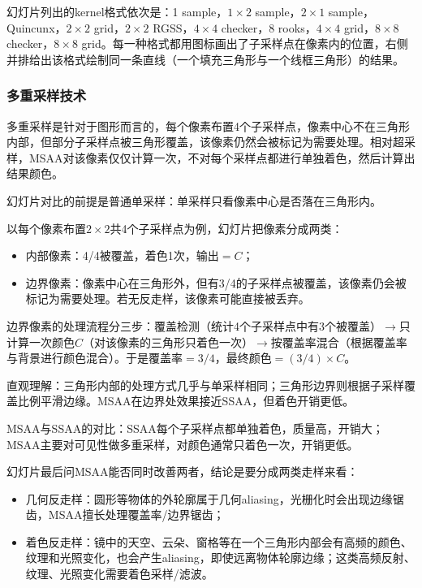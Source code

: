 幻灯片列出的kernel格式依次是：1 sample，$1\times2$ sample，$2\times1$ sample，Quincunx，$2\times2$ grid，$2\times2$ RGSS，$4\times4$ checker，8 rooks，$4\times4$ grid，$8\times8$ checker，$8\times8$ grid。每一种格式都用图标画出了子采样点在像素内的位置，右侧并排给出该格式绘制同一条直线（一个填充三角形与一个线框三角形）的结果。

\subsubsection{多重采样技术}

多重采样是针对于图形而言的，每个像素布置4个子采样点，像素中心不在三角形内部，但部分子采样点被三角形覆盖，该像素仍然会被标记为需要处理。相对超采样，MSAA对该像素仅仅计算一次，不对每个采样点都进行单独着色，然后计算出结果颜色。

幻灯片对比的前提是普通单采样：单采样只看像素中心是否落在三角形内。

以每个像素布置$2\times2$共4个子采样点为例，幻灯片把像素分成两类：

\begin{itemize}[nosep]
\item 内部像素：4/4被覆盖，着色1次，输出$= C$；
\item 边界像素：像素中心在三角形外，但有3/4的子采样点被覆盖，该像素仍会被标记为需要处理。若无反走样，该像素可能直接被丢弃。
\end{itemize}

边界像素的处理流程分三步：覆盖检测（统计4个子采样点中有3个被覆盖）$\to$只计算一次颜色$C$（对该像素的三角形只着色一次）$\to$按覆盖率混合（根据覆盖率与背景进行颜色混合）。于是覆盖率$= 3/4$，最终颜色$= (3/4)\times C$。

直观理解：三角形内部的处理方式几乎与单采样相同；三角形边界则根据子采样覆盖比例平滑边缘。MSAA在边界处效果接近SSAA，但着色开销更低。

MSAA与SSAA的对比：SSAA每个子采样点都单独着色，质量高，开销大；MSAA主要对可见性做多重采样，对颜色通常只着色一次，开销更低。

幻灯片最后问MSAA能否同时改善两者，结论是要分成两类走样来看：

\begin{itemize}[nosep]
\item 几何反走样：圆形等物体的外轮廓属于几何aliasing，光栅化时会出现边缘锯齿，MSAA擅长处理覆盖率/边界锯齿；
\item 着色反走样：镜中的天空、云朵、窗格等在一个三角形内部会有高频的颜色、纹理和光照变化，也会产生aliasing，即使远离物体轮廓边缘；这类高频反射、纹理、光照变化需要着色采样/滤波。
\end{itemize}

